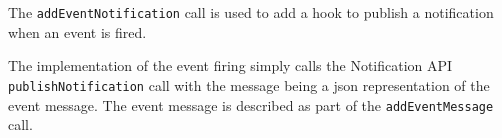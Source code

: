 The \verb+addEventNotification+ call is used to add a hook to publish a \Rapture notification when an event is fired.

The implementation of the event firing simply calls the Notification API \verb+publishNotification+ call with the message being a json
representation of the event message. The event message is described as part of the \verb+addEventMessage+ call.
